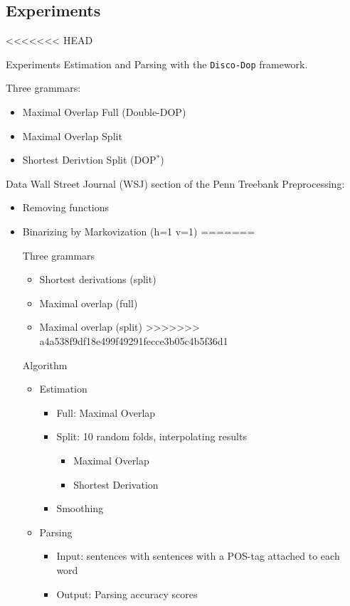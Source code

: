 \documentclass{beamer}
\newcommand{\dops}[0]{DOP$ ^*$}
\newcommand{\ddop}[0]{Double-DOP}
\begin{document}
\subsection{Experiments}
<<<<<<< HEAD
\begin{frame}{Experiments}
Estimation and Parsing with the {\tt Disco-Dop} framework.

Three grammars:
\begin{itemize}
\item Maximal Overlap Full (\ddop{})
\item Maximal Overlap Split
\item Shortest Derivtion Split (\dops{})
\end{itemize}
\end{frame}
\begin{frame}{Data}
Wall Street Journal (WSJ) section of the Penn Treebank
Preprocessing:\begin{itemize}
\item Removing functions
\item Binarizing by Markovization (h=1 v=1)
=======
\begin{frame}{Three grammars}
\begin{itemize}
\item Shortest derivations (split)
\item Maximal overlap (full)
\item Maximal overlap (split)
>>>>>>> a4a538f9df18e499f49291fecce3b05c4b5f36d1
\end{itemize}
\end{frame}

\begin{frame}{Algorithm}
\begin{itemize}
	\item Estimation
		\begin{itemize}
			\item Full: Maximal Overlap
			\item Split: 10 random folds, interpolating results
				\begin{itemize} 
					\item Maximal Overlap 
					\item Shortest Derivation
				\end{itemize}
			\item Smoothing
		\end{itemize}
	\item Parsing
		\begin{itemize}
			\item Input: sentences with  sentences with a POS-tag attached to each word
			\item Output: Parsing accuracy scores
		\end{itemize}
\end{itemize}
\end{frame}


\end{itemize}
\end{frame}
\end{document}
